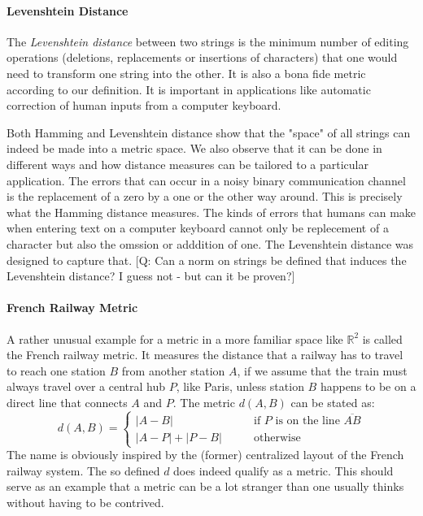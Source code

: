 \paragraph{Levenshtein Distance} 
The \emph{Levenshtein distance} between two strings is the minimum number of editing operations (deletions, replacements or insertions of characters) that one would need to transform one string into the other. It is also a bona fide metric according to our definition. It is important in applications like automatic correction of human inputs from a computer keyboard.

\medskip
Both Hamming and Levenshtein distance show that the "space" of all strings can indeed be made into a metric space. We also observe that it can be done in different ways and how distance measures can be tailored to a particular application. The errors that can occur in a noisy binary communication channel is the replacement of a zero by a one or the other way around. This is precisely what the Hamming distance measures. The kinds of errors that humans can make when entering text on a computer keyboard cannot only be replecement of a character but also the omssion or adddition of one. The Levenshtein distance was designed to capture that. [Q: Can a norm on strings be defined that induces the Levenshtein distance? I guess not - but can it be proven?] 


\paragraph{French Railway Metric}
A rather unusual example for a metric in a more familiar space like $\mathbb{R}^2$ is called the French railway metric. It measures the distance that a railway has to travel to reach one station $B$ from another station $A$, if we assume that the train must always travel over a central hub $P$, like Paris, unless station $B$ happens to be on a direct line that connects $A$ and $P$. The metric $d(A,B)$ can be stated as:
\begin{equation}
d(A,B) =
\begin{cases}
|A-B|          & \qquad \text{if $P$ is on the line $\overline{AB}$} \\
|A-P| + |P-B|  & \qquad \text{otherwise} 
\end{cases}
\end{equation}
The name is obviously inspired by the (former) centralized layout of the French railway system. The so defined $d$ does indeed qualify as a metric. This should serve as an example that a metric can be a lot stranger than one usually thinks without having to be contrived.

